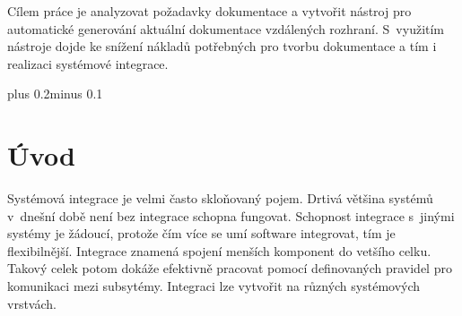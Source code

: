 \documentclass[11pt,twoside,a4paper]{book}
\begin{document}
Cílem práce je analyzovat požadavky dokumentace a vytvořit nástroj pro automatické
generování aktuální dokumentace vzdálených rozhraní. S~využitím nástroje dojde ke snížení
nákladů potřebných pro tvorbu dokumentace a tím i realizaci systémové integrace.



\tableofcontents
{} 



\listoffigures



\listoftables

\lstlistoflistings 



\mainbodystarts
\normalfont
{}\baselineskip plus 0.2\baselineskip minus 0.1\baselineskip



% 
% 

% 
\chapter{Úvod} 
Systémová integrace je velmi často skloňovaný pojem. Drtivá většina systémů v~dnešní době
není bez integrace schopna fungovat. Schopnost integrace s~jinými systémy je žádoucí,
protože čím více se umí software integrovat, tím je flexibilnější. Integrace znamená spojení
menších komponent do vetšího celku. Takový celek potom dokáže efektivně pracovat pomocí
definovaných pravidel pro komunikaci mezi subsytémy. Integraci lze vytvořit na různých
systémových vrstvách.
\end{document}
